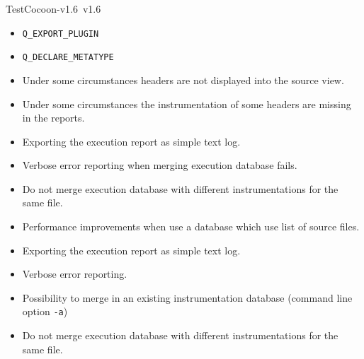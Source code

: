 \begin{TestCocoonDownload}
\begin{ReleaseNote}{TestCocoon-v1.6}{\TestCocoon\ v1.6}
\begin{description}
\begin{itemize}
                  \begin{itemize}
                    \item \verb$Q_EXPORT_PLUGIN$
                    \item \verb$Q_DECLARE_METATYPE$
                  \end{itemize}
  \end{itemize}
\item[\CoverageBrowser]
  \begin{itemize}
    \item \BugFix     Under some circumstances headers are not displayed into the source view.
    \item \BugFix     Under some circumstances the instrumentation of some headers are missing in the reports.
    \item \NewFeature Exporting the execution report as simple text log.
    \item \NewFeature Verbose error reporting when merging execution database fails.
    \item \BugFix     Do not merge execution database with different instrumentations for the same file.
    \item \Profiling  Performance improvements when use a database which use list of source files.
  \end{itemize}
\item[\cmreport]
  \begin{itemize}
    \item \NewFeature Exporting the execution report as simple text log.
  \end{itemize}
\item[\cmmerge]
  \begin{itemize}
    \item \NewFeature Verbose error reporting.
    \item \NewFeature Possibility to merge in an existing instrumentation database (command line option \verb$-a$)
    \item \BugFix     Do not merge execution database with different instrumentations for the same file.
  \end{itemize}
\end{description}
\end{ReleaseNote}
\end{TestCocoonDownload}



